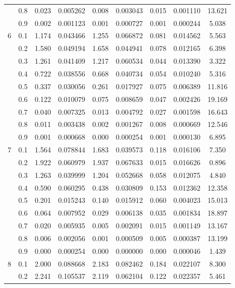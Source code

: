 \begin{longtable}{ | c | c || c | c | c | c | c | c | c | }
 & 0.8 & 0.023 & 0.005262 & 0.008 & 0.003043 & 0.015 & 0.001110 & 13.621 \\
 & 0.9 & 0.002 & 0.001123 & 0.001 & 0.000727 & 0.001 & 0.000244 & 5.038 \\
 \hline
\multirow{9}{*}{6} & 0.1 & 1.174 & 0.043466 & 1.255 & 0.066872 & 0.081 & 0.014562 & 5.563 \\
 & 0.2 & 1.580 & 0.049194 & 1.658 & 0.044941 & 0.078 & 0.012165 & 6.398 \\
 & 0.3 & 1.261 & 0.041409 & 1.217 & 0.060534 & 0.044 & 0.013390 & 3.322 \\
 & 0.4 & 0.722 & 0.038556 & 0.668 & 0.040734 & 0.054 & 0.010240 & 5.316 \\
 & 0.5 & 0.337 & 0.030056 & 0.261 & 0.017927 & 0.075 & 0.006389 & 11.816 \\
 & 0.6 & 0.122 & 0.010079 & 0.075 & 0.008659 & 0.047 & 0.002426 & 19.169 \\
 & 0.7 & 0.040 & 0.007325 & 0.013 & 0.004792 & 0.027 & 0.001598 & 16.643 \\
 & 0.8 & 0.011 & 0.003438 & 0.002 & 0.001267 & 0.008 & 0.000669 & 12.546 \\
 & 0.9 & 0.001 & 0.000668 & 0.000 & 0.000254 & 0.001 & 0.000130 & 6.895 \\
 \hline
\multirow{9}{*}{7} & 0.1 & 1.564 & 0.078844 & 1.683 & 0.039573 & 0.118 & 0.016106 & 7.350 \\
 & 0.2 & 1.922 & 0.060979 & 1.937 & 0.067633 & 0.015 & 0.016626 & 0.896 \\
 & 0.3 & 1.263 & 0.039999 & 1.204 & 0.052668 & 0.058 & 0.012075 & 4.840 \\
 & 0.4 & 0.590 & 0.060295 & 0.438 & 0.030809 & 0.153 & 0.012362 & 12.358 \\
 & 0.5 & 0.201 & 0.015243 & 0.140 & 0.015912 & 0.060 & 0.004023 & 15.013 \\
 & 0.6 & 0.064 & 0.007952 & 0.029 & 0.006138 & 0.035 & 0.001834 & 18.897 \\
 & 0.7 & 0.020 & 0.005935 & 0.005 & 0.002091 & 0.015 & 0.001149 & 13.167 \\
 & 0.8 & 0.006 & 0.002056 & 0.001 & 0.000509 & 0.005 & 0.000387 & 13.199 \\
 & 0.9 & 0.000 & 0.000254 & 0.000 & 0.000000 & 0.000 & 0.000046 & 1.439 \\
 \hline
\multirow{9}{*}{8} & 0.1 & 2.000 & 0.088668 & 2.183 & 0.082462 & 0.184 & 0.022107 & 8.300 \\
 & 0.2 & 2.241 & 0.105537 & 2.119 & 0.062104 & 0.122 & 0.022357 & 5.461 \\

\end{longtable}
